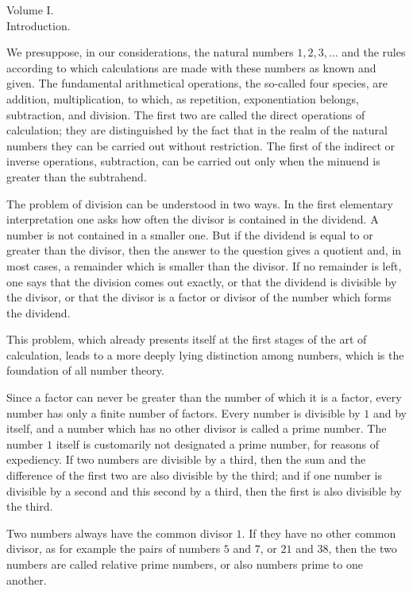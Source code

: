\documentclass[11pt]{article}
\begin{document}
\begin{center}
{\large Volume I.}\\[0.5em]
{\Large Introduction.}\\[0.4em]
\end{center}

We presuppose, in our considerations, the natural numbers $1,2,3,\ldots$ and the rules according to which calculations are made with these numbers as known and given. The fundamental arithmetical operations, the so-called four species, are addition, multiplication, to which, as repetition, exponentiation belongs, subtraction, and division. The first two are called the direct operations of calculation; they are distinguished by the fact that in the realm of the natural numbers they can be carried out without restriction. The first of the indirect or inverse operations, subtraction, can be carried out only when the minuend is greater than the subtrahend.

The problem of division can be understood in two ways. In the first elementary interpretation one asks how often the divisor is contained in the dividend. A number is not contained in a smaller one. But if the dividend is equal to or greater than the divisor, then the answer to the question gives a quotient and, in most cases, a remainder which is smaller than the divisor. If no remainder is left, one says that the division comes out exactly, or that the dividend is divisible by the divisor, or that the divisor is a factor or divisor of the number which forms the dividend.

This problem, which already presents itself at the first stages of the art of calculation, leads to a more deeply lying distinction among numbers, which is the foundation of all number theory.

Since a factor can never be greater than the number of which it is a factor, every number has only a finite number of factors. Every number is divisible by $1$ and by itself, and a number which has no other divisor is called a prime number. The number $1$ itself is customarily not designated a prime number, for reasons of expediency. If two numbers are divisible by a third, then the sum and the difference of the first two are also divisible by the third; and if one number is divisible by a second and this second by a third, then the first is also divisible by the third.

Two numbers always have the common divisor $1$. If they have no other common divisor, as for example the pairs of numbers $5$ and $7$, or $21$ and $38$, then the two numbers are called relative prime numbers, or also numbers prime to one another.
\end{document}
